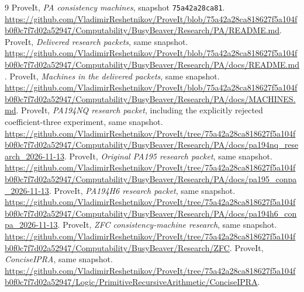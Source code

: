 \documentclass[11pt]{article}
\begin{document}
\clearpage
\begin{thebibliography}{9}
 ProveIt, \emph{PA consistency machines}, snapshot \texttt{75a42a28ca81}.
\url{https://github.com/VladimirReshetnikov/ProveIt/blob/75a42a28ca818627f5a104fb0f0c7f7d02a52947/Computability/BusyBeaver/Research/PA/README.md}.
 ProveIt, \emph{Delivered research packets}, same snapshot.
\url{https://github.com/VladimirReshetnikov/ProveIt/blob/75a42a28ca818627f5a104fb0f0c7f7d02a52947/Computability/BusyBeaver/Research/PA/docs/README.md}.
 ProveIt, \emph{Machines in the delivered packets}, same snapshot.
\url{https://github.com/VladimirReshetnikov/ProveIt/blob/75a42a28ca818627f5a104fb0f0c7f7d02a52947/Computability/BusyBeaver/Research/PA/docs/MACHINES.md}.
 ProveIt, \emph{PA194NQ research packet}, including the explicitly rejected coefficient-three experiment, same snapshot.
\url{https://github.com/VladimirReshetnikov/ProveIt/tree/75a42a28ca818627f5a104fb0f0c7f7d02a52947/Computability/BusyBeaver/Research/PA/docs/pa194nq_research_2026-11-13}.
 ProveIt, \emph{Original PA195 research packet}, same snapshot.
\url{https://github.com/VladimirReshetnikov/ProveIt/tree/75a42a28ca818627f5a104fb0f0c7f7d02a52947/Computability/BusyBeaver/Research/PA/docs/pa195_conpa_2026-11-13}.
 ProveIt, \emph{PA194H6 research packet}, same snapshot.
\url{https://github.com/VladimirReshetnikov/ProveIt/tree/75a42a28ca818627f5a104fb0f0c7f7d02a52947/Computability/BusyBeaver/Research/PA/docs/pa194h6_conpa_2026-11-13}.
 ProveIt, \emph{ZFC consistency-machine research}, same snapshot.
\url{https://github.com/VladimirReshetnikov/ProveIt/tree/75a42a28ca818627f5a104fb0f0c7f7d02a52947/Computability/BusyBeaver/Research/ZFC}.
 ProveIt, \emph{ConciseIPRA}, same snapshot.
\url{https://github.com/VladimirReshetnikov/ProveIt/tree/75a42a28ca818627f5a104fb0f0c7f7d02a52947/Logic/PrimitiveRecursiveArithmetic/ConciseIPRA}.
\end{thebibliography}
\end{document}
